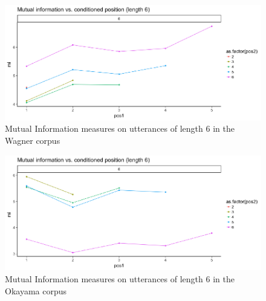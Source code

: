 \documentclass[10pt, letterpaper]{article}
\newenvironment{CodeChunk}{}{}
\begin{document}
\begin{CodeChunk}
\begin{figure}[h]

{\centering \includegraphics{figs/MI_wagner-1} 

}

\caption[Mutual Information measures on utterances of length 6 in the Wagner corpus]{Mutual Information measures on utterances of length 6 in the Wagner corpus}\label{fig:MI_wagner}
\end{figure}
\end{CodeChunk}

\begin{CodeChunk}
\begin{figure}[h]

{\centering \includegraphics{figs/MI_okayama-1} 

}

\caption[Mutual Information measures on utterances of length 6 in the Okayama corpus]{Mutual Information measures on utterances of length 6 in the Okayama corpus}\label{fig:MI_okayama}
\end{figure}
\end{CodeChunk}
\end{document}
